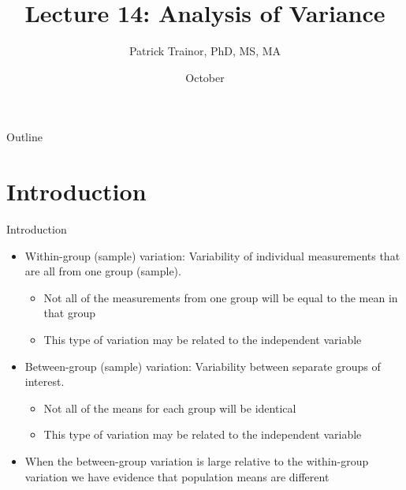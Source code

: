 \documentclass[xcolor=dvipsnames]{beamer}
\title[Lecture 14]{Lecture 14: Analysis of Variance}
\author[Patrick Trainor]{Patrick Trainor, PhD, MS, MA}
\institute[NMSU]{New Mexico State University}
\date{October}
\begin{document}
	
\begin{frame}
	\maketitle
\end{frame}

\begin{frame}{Outline}
	\tableofcontents[hideallsubsections]
\end{frame}

\section{Introduction}

\begin{frame}{Introduction}
	\begin{itemize}
		\item Within-group (sample) variation: Variability of individual measurements that are all from one group (sample). 
		\begin{itemize}
			\item Not all of the measurements from one group will be equal to the mean in that group
			\item This type of variation may be related to the independent variable
		\end{itemize}
		
		\item Between-group (sample) variation: Variability between separate groups of interest. 
		\begin{itemize}
			\item Not all of the means for each group will be identical
			\item This type of variation may be related to the independent variable
		\end{itemize}
		
		\item When the between-group variation is large relative to the within-group variation we have evidence that population means are different 
		
	\end{itemize}
\end{frame}
\end{document}
